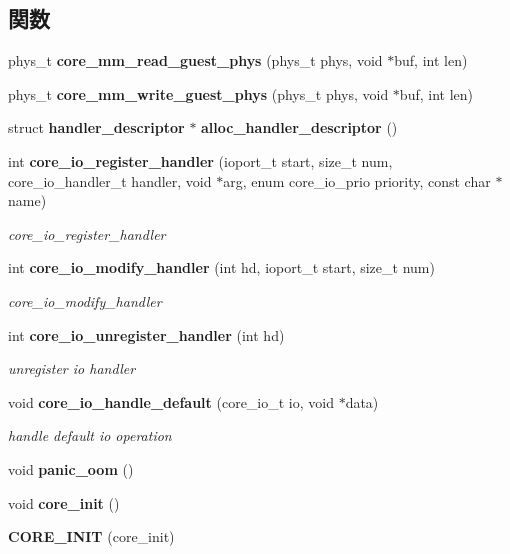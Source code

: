 \subsection*{関数}
\begin{DoxyCompactItemize}
\item 
phys\-\_\-t {\bfseries core\-\_\-mm\-\_\-read\-\_\-guest\-\_\-phys} (phys\-\_\-t phys, void $\ast$buf, int len)\label{core_8c_ab1993aecb38f15c17376b1bfe177c7d1}

\item 
phys\-\_\-t {\bfseries core\-\_\-mm\-\_\-write\-\_\-guest\-\_\-phys} (phys\-\_\-t phys, void $\ast$buf, int len)\label{core_8c_aefc9af00d27a366118da9e08055b6669}

\item 
struct {\bf handler\-\_\-descriptor} $\ast$ {\bfseries alloc\-\_\-handler\-\_\-descriptor} ()\label{core_8c_a9ce7943618e2f0478aad2467c8661011}

\item 
int {\bf core\-\_\-io\-\_\-register\-\_\-handler} (ioport\-\_\-t start, size\-\_\-t num, core\-\_\-io\-\_\-handler\-\_\-t handler, void $\ast$arg, enum core\-\_\-io\-\_\-prio priority, const char $\ast$name)
\begin{DoxyCompactList}\small\item\em core\-\_\-io\-\_\-register\-\_\-handler \end{DoxyCompactList}\item 
int {\bf core\-\_\-io\-\_\-modify\-\_\-handler} (int hd, ioport\-\_\-t start, size\-\_\-t num)
\begin{DoxyCompactList}\small\item\em core\-\_\-io\-\_\-modify\-\_\-handler \end{DoxyCompactList}\item 
int {\bf core\-\_\-io\-\_\-unregister\-\_\-handler} (int hd)
\begin{DoxyCompactList}\small\item\em unregister io handler \end{DoxyCompactList}\item 
void {\bf core\-\_\-io\-\_\-handle\-\_\-default} (core\-\_\-io\-\_\-t io, void $\ast$data)
\begin{DoxyCompactList}\small\item\em handle default io operation \end{DoxyCompactList}\item 
void {\bfseries panic\-\_\-oom} ()\label{core_8c_a0d1e14cc93c27697e1bd1db081cb6e06}

\item 
void {\bfseries core\-\_\-init} ()\label{core_8c_a166d6adeedf84c1aad6848b3573382e6}

\item 
{\bfseries \-C\-O\-R\-E\-\_\-\-I\-N\-I\-T} (core\-\_\-init)\label{core_8c_a1201a35737d21eddeaf96ddb867d55cd}

\end{DoxyCompactItemize}
